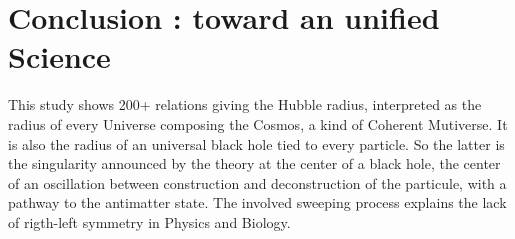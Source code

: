 \documentclass[a4paper,9pt]{article}
\begin{document}






    





\section{Conclusion : toward an unified Science}

This study shows 200+ relations giving the Hubble radius, interpreted as the radius of every Universe composing the Cosmos, a kind of Coherent Mutiverse. It is also the radius of an universal black hole tied to every particle. So the latter is the singularity announced by the theory at the center of a black hole, the center of an oscillation between construction and deconstruction of the particule, with a pathway to the antimatter state. The involved sweeping process explains the lack of rigth-left symmetry  in Physics and Biology.
\end{document}
